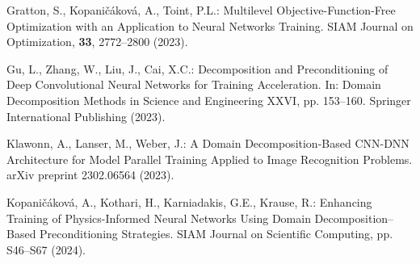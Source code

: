\documentclass{article}
\begin{document}
\begin{thebibliography}{40.}
 Gratton, S., Kopaničáková, A., Toint, P.L.: Multilevel Objective-Function-Free Optimization with an Application to Neural Networks Training. SIAM Journal on Optimization, \textbf{33}, 2772–2800 (2023). 

 Gu, L., Zhang, W., Liu, J., Cai, X.C.: Decomposition and Preconditioning of Deep Convolutional Neural Networks for Training Acceleration. In: Domain Decomposition Methods in Science and Engineering XXVI, pp. 153–160. Springer International Publishing (2023). 

 Klawonn, A., Lanser, M., Weber, J.: A Domain Decomposition-Based CNN-DNN Architecture for Model Parallel Training Applied to Image Recognition Problems. arXiv preprint 2302.06564 (2023).

Kopaničáková, A., Kothari, H., Karniadakis, G.E., Krause, R.: Enhancing Training of Physics-Informed Neural Networks Using Domain Decomposition–Based Preconditioning Strategies. SIAM Journal on Scientific Computing, pp. S46–S67 (2024).

\end{thebibliography}
\end{document}
